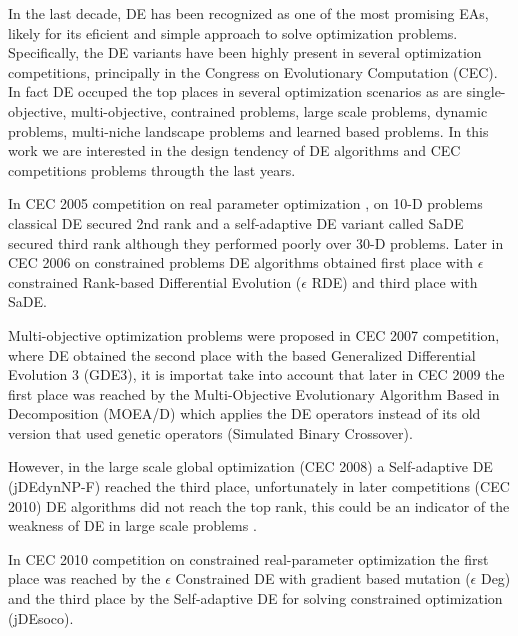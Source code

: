 In the last decade, DE has been recognized as one of the most promising EAs, likely for its eficient and simple approach to solve optimization problems.
%
Specifically, the DE variants have been highly present in several optimization competitions, principally in the Congress on Evolutionary Computation (CEC).
%
In fact DE occuped the top places in several optimization scenarios as are single-objective, multi-objective, contrained problems, large scale problems, dynamic problems, multi-niche landscape problems and learned based problems.
%
In this work we are interested in the design tendency of DE algorithms and CEC competitions problems througth the last years.
%

In CEC 2005 competition on real parameter optimization \cite{CEC2005}, on 10-D problems classical DE secured 2nd rank and a self-adaptive DE variant called SaDE secured third rank although they performed poorly over 30-D problems.
%
Later in CEC 2006 on constrained problems \cite{CEC2006} DE algorithms obtained first place with $\epsilon$ constrained Rank-based Differential Evolution ($\epsilon$ RDE) and third place with SaDE.
%

Multi-objective optimization problems were proposed in CEC 2007 \cite{CEC2007} competition, where DE obtained the second place with the based Generalized Differential Evolution 3 (GDE3), it is importat take into account that later in CEC 2009 the first place was reached by the Multi-Objective Evolutionary Algorithm Based in Decomposition (MOEA/D) which applies the DE operators instead of its old version that used genetic operators (Simulated Binary Crossover).

%
However, in the large scale global optimization (CEC 2008) \cite{CEC2008} a Self-adaptive DE (jDEdynNP-F) reached the third place, unfortunately in later competitions (CEC 2010) DE algorithms did not reach the top rank, this could be an indicator of the weakness of DE in large scale problems \cite{segura2015improving}.

In CEC 2010 competition on constrained real-parameter optimization \cite{CEC2010} the first place was reached by the $\epsilon$ Constrained DE with gradient based mutation ($\epsilon$ Deg) and the third place by the Self-adaptive DE for solving constrained optimization (jDEsoco).

